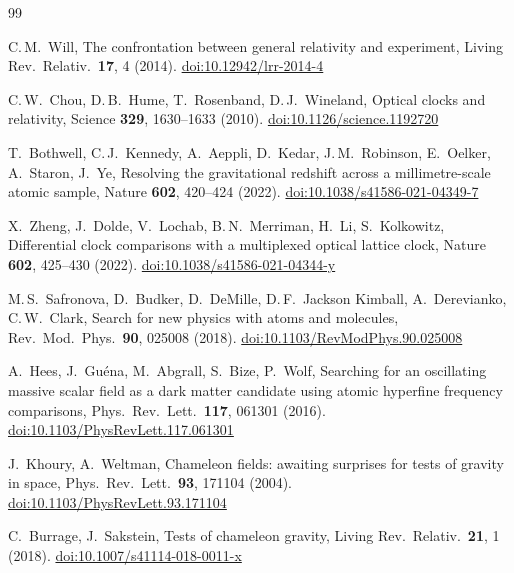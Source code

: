 \documentclass[12pt,a4paper]{article}
\begin{document}
\begin{thebibliography}{99}\small

C.\,M.\ Will, The confrontation between general relativity and experiment,
Living Rev.\ Relativ.\ \textbf{17}, 4 (2014).
\href{https://doi.org/10.12942/lrr-2014-4}{doi:10.12942/lrr-2014-4}

C.\,W.\ Chou, D.\,B.\ Hume, T.\ Rosenband, D.\,J.\ Wineland, Optical clocks and relativity,
Science \textbf{329}, 1630--1633 (2010).
\href{https://doi.org/10.1126/science.1192720}{doi:10.1126/science.1192720}

T.\ Bothwell, C.\,J.\ Kennedy, A.\ Aeppli, D.\ Kedar, J.\,M.\ Robinson, E.\ Oelker, A.\ Staron, J.\ Ye,
Resolving the gravitational redshift across a millimetre-scale atomic sample,
Nature \textbf{602}, 420--424 (2022).
\href{https://doi.org/10.1038/s41586-021-04349-7}{doi:10.1038/s41586-021-04349-7}

X.\ Zheng, J.\ Dolde, V.\ Lochab, B.\,N.\ Merriman, H.\ Li, S.\ Kolkowitz,
Differential clock comparisons with a multiplexed optical lattice clock,
Nature \textbf{602}, 425--430 (2022).
\href{https://doi.org/10.1038/s41586-021-04344-y}{doi:10.1038/s41586-021-04344-y}

M.\,S.\ Safronova, D.\ Budker, D.\ DeMille, D.\,F.\ Jackson Kimball, A.\ Derevianko, C.\,W.\ Clark,
Search for new physics with atoms and molecules, Rev.\ Mod.\ Phys.\ \textbf{90}, 025008 (2018).
\href{https://doi.org/10.1103/RevModPhys.90.025008}{doi:10.1103/RevModPhys.90.025008}

A.\ Hees, J.\ Gu\'ena, M.\ Abgrall, S.\ Bize, P.\ Wolf, Searching for an oscillating massive scalar field as a
dark matter candidate using atomic hyperfine frequency comparisons,
Phys.\ Rev.\ Lett.\ \textbf{117}, 061301 (2016).
\href{https://doi.org/10.1103/PhysRevLett.117.061301}{doi:10.1103/PhysRevLett.117.061301}

J.\ Khoury, A.\ Weltman, Chameleon fields: awaiting surprises for tests of gravity in space,
Phys.\ Rev.\ Lett.\ \textbf{93}, 171104 (2004).
\href{https://doi.org/10.1103/PhysRevLett.93.171104}{doi:10.1103/PhysRevLett.93.171104}

C.\ Burrage, J.\ Sakstein, Tests of chameleon gravity, Living Rev.\ Relativ.\ \textbf{21}, 1 (2018).
\href{https://doi.org/10.1007/s41114-018-0011-x}{doi:10.1007/s41114-018-0011-x}


\end{thebibliography}
\end{document}
